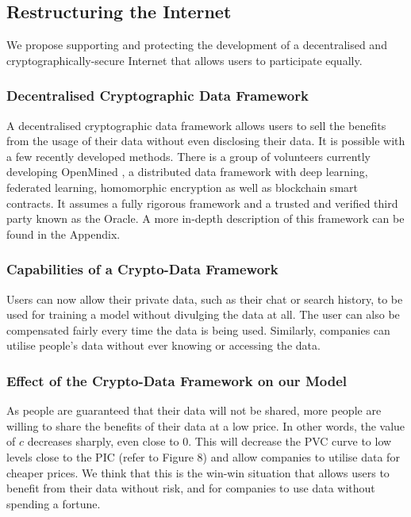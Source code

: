 \documentclass{icmmcm}
\begin{document}
\subsection{Restructuring the Internet}
We propose supporting and protecting the development of a decentralised and cryptographically-secure Internet that allows users to participate equally.
\subsubsection{Decentralised Cryptographic Data Framework}
\label{subsubsec:decen}
A decentralised cryptographic data framework allows users to sell the benefits from the usage of their data without even disclosing their data. It is possible with a few recently developed methods. There is a group of volunteers currently developing OpenMined \citep{openmined}, a distributed data framework with deep learning, federated learning, homomorphic encryption as well as blockchain smart contracts. It assumes a fully rigorous framework and a trusted and verified third party known as the Oracle. A more in-depth description of this framework can be found in the Appendix.

\subsubsection{Capabilities of a Crypto-Data Framework}
Users can now allow their private data, such as their chat or search history, to be used for training a model without divulging the data at all. The user can also be compensated fairly every time the data is being used. Similarly, companies can utilise people’s data without ever knowing or accessing the data. 
\subsubsection{Effect of the Crypto-Data Framework on our Model}
As people are guaranteed that their data will not be shared, more people are willing to share the benefits of their data at a low price. In other words, the value of $c$ decreases sharply, even close to 0. This will decrease the PVC curve to low levels close to the PIC (refer to Figure 8) and allow companies to utilise data for cheaper prices. We think that this is the win-win situation that allows users to benefit from their data without risk, and for companies to use data without spending a fortune.
\end{document}
